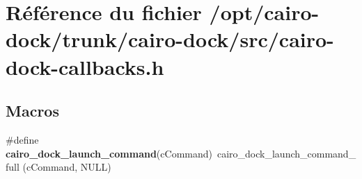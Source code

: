 \section{Référence du fichier /opt/cairo-dock/trunk/cairo-dock/src/cairo-dock-callbacks.h}
\label{cairo-dock-callbacks_8h}
\subsection*{Macros}
\begin{CompactItemize}
\item 
\#define {\bf cairo\_\-dock\_\-launch\_\-command}(cCommand)~cairo\_\-dock\_\-launch\_\-command\_\-full (cCommand, NULL)
\end{CompactItemize}
